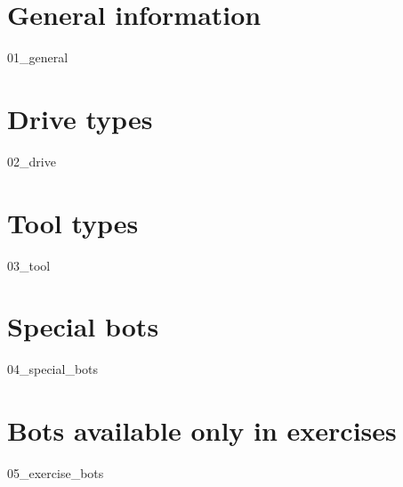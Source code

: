 \chapter{General information}
{01_general}

\chapter{Drive types}
{02_drive}

\chapter{Tool types}
{03_tool}

\chapter{Special bots}
{04_special_bots}

\chapter{Bots available only in exercises}
{05_exercise_bots}